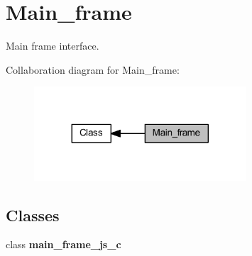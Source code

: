 \section{Main\+\_\+frame}
\label{group__main__frame}


Main frame interface.  


Collaboration diagram for Main\+\_\+frame\+:
\nopagebreak
\begin{figure}[H]
\begin{center}
\leavevmode
\includegraphics[width=224pt]{group__main__frame}
\end{center}
\end{figure}
\subsection*{Classes}
\begin{DoxyCompactItemize}
\item 
class \textbf{ main\+\_\+frame\+\_\+js\+\_\+c}
\end{DoxyCompactItemize}
